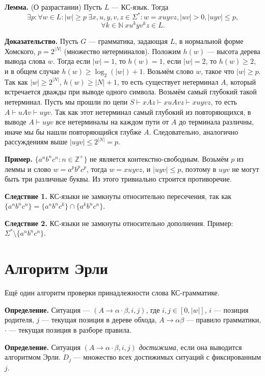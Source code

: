 \textbf{Лемма.} (О разрастании) Пусть $L$ --- КС-язык. Тогда
\[
    \exists p: \forall w \in L: |w| \ge p~ \exists x, u, y, v, z \in \Sigma^*: w = xuyvz, |uv| > 0, |uyv| \le p,
\]
\[
    \forall k \in \mathbb N~xu^kyv^kz \in L.
\]

\textbf{Доказательство.} Пусть $G$ --- грамматика, задающая $L$, в нормальной форме Хомского, $p = 2^{|N|}$ (множество нетерминалов).
Положим $h(w)$ --- высота дерева вывода слова $w$.
Тогда если $|w| = 1$, то $h(w) = 1$, если $|w| = 2$, то $h(w) \ge 2$, и в общем случае $h(w) \ge \log_2(|w|) + 1$.
Возьмём слово $w$, такое что $|w| \ge p$.
Так как $|w| \ge 2^{|N|}$, $h(w) \ge |N| + 1$, то есть существует нетерминал $A$, который встречается дважды при выводе одного символа.
Возьмём самый глубокий такой нетерминал.
Пусть мы прошли по цепи $S \vdash xAz \vdash xuAvz \vdash xuyvz$, то есть $A \vdash uAv \vdash uyv$.
Так как этот нетерминал самый глубокий из повторяющихся, в выводе $A \vdash uyv$ все нетерминалы на каждом пути от $A$ до терминала различны, иначе мы бы нашли повторяющийся глубже $A$.
Следовательно, аналогично рассуждениям выше $|uyv| \le 2^{|N|} = p$.

\QED

\textbf{Пример.} $\{a^nb^nc^n: n \in \mathbb Z^+\}$ не является контекстно-свободным.
Возьмём $p$ из леммы и слово $w = a^pb^pc^p$, тогда $w = xuyvz$, и $|uyv| \le p$, поэтому в $uyv$ не могут быть три различные буквы.
Из этого тривиально строится противоречие.

\textbf{Следствие 1.} КС-языки не замкнуты относительно пересечения, так как $\{a^nb^nc^n\} = \{a^nb^nc^k\} \cap \{a^kb^nc^n\}$.

\textbf{Следствие 2.} КС-языки не замкнуты относительно дополнения. Пример: $\Sigma^* \setminus \{a^nb^nc^n\}$.

\section{Алгоритм Эрли}
Ещё один алгоритм проверки принадлежности слова КС-грамматике.

\textbf{Определение.} Ситуация --- $(A \to \alpha \cdot \beta, i, j)$, где $i, j \in [0, |w|]$, $i$ --- позиция родителя, $j$ --- текущая позиция в дереве обхода, $A \to \alpha \beta$ --- правило грамматики, $\cdot$ --- текущая позиция в разборе правила.

\textbf{Определение.} Ситуация $(A \to \alpha \cdot \beta, i, j)$ \textit{достижима}, если она выводится алгоритмом Эрли. $D_j$ --- множество всех достижимых ситуаций с фиксированным $j$.

